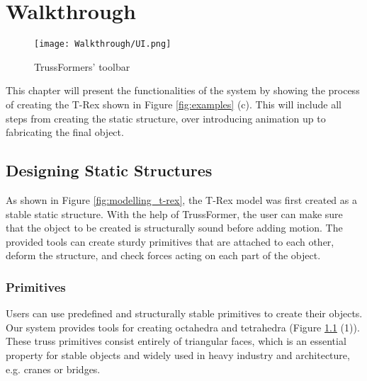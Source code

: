 
\chapter{Walkthrough}\label{ch:walkthrough}
\begin{figure}[ht!]
    \texttt{[image: Walkthrough/UI.png]}
    \centering
    \caption{TrussFormers' toolbar}
    \label{fig:toolbar}
\end{figure}
This chapter will present the functionalities of the system by showing the process of creating the T-Rex shown in Figure \ref{fig:examples} (c). This will include all steps from creating the static structure, over introducing animation up to fabricating the final object.

\section{Designing Static Structures}
As shown in Figure \ref{fig:modelling_t-rex}, the T-Rex model was first created as a stable static structure. With the help of TrussFormer, the user can make sure that the object to be created is structurally sound before adding motion. The provided tools can create sturdy primitives that are attached to each other, deform the structure, and check forces acting on each part of the object.

\subsection{Primitives}
Users can use predefined and structurally stable primitives to create their objects. Our system provides tools for creating octahedra and tetrahedra (Figure \ref{fig:toolbar} (1)). These truss primitives consist entirely of triangular faces, which is an essential property for stable objects and widely used in heavy industry and architecture, e.g. cranes or bridges.

